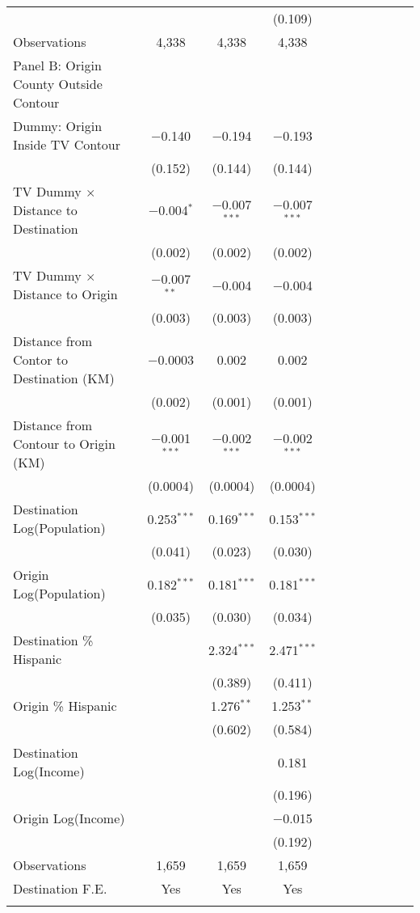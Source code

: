 \begin{table}[!h]
{\begin{threeparttable}
\begin{tabular}{lcccccccccc}
  &  &  & (0.109) \\ 
Observations & 4,338 & 4,338 & 4,338 \\ 
\hline\addlinespace
Panel B: Origin County Outside Contour & & & \\ 
\hline\addlinespace
 Dummy: Origin Inside TV Contour & $-$0.140 & $-$0.194 & $-$0.193 \\ 
  & (0.152) & (0.144) & (0.144) \\ 
 TV Dummy $\times$ Distance to Destination & $-$0.004$^{*}$ & $-$0.007$^{***}$ & $-$0.007$^{***}$ \\ 
  & (0.002) & (0.002) & (0.002) \\ 
 TV Dummy $\times$ Distance to Origin & $-$0.007$^{**}$ & $-$0.004 & $-$0.004 \\ 
  & (0.003) & (0.003) & (0.003) \\ 
 Distance from Contor to Destination (KM) & $-$0.0003 & 0.002 & 0.002 \\ 
  & (0.002) & (0.001) & (0.001) \\ 
 Distance from Contour to Origin (KM) & $-$0.001$^{***}$ & $-$0.002$^{***}$ & $-$0.002$^{***}$ \\ 
  & (0.0004) & (0.0004) & (0.0004) \\ 
 Destination Log(Population) & 0.253$^{***}$ & 0.169$^{***}$ & 0.153$^{***}$ \\ 
  & (0.041) & (0.023) & (0.030) \\ 
 Origin Log(Population) & 0.182$^{***}$ & 0.181$^{***}$ & 0.181$^{***}$ \\ 
  & (0.035) & (0.030) & (0.034) \\ 
 Destination \% Hispanic &  & 2.324$^{***}$ & 2.471$^{***}$ \\ 
  &  & (0.389) & (0.411) \\ 
 Origin \% Hispanic &  & 1.276$^{**}$ & 1.253$^{**}$ \\ 
  &  & (0.602) & (0.584) \\ 
 Destination Log(Income) &  &  & 0.181 \\ 
  &  &  & (0.196) \\ 
 Origin Log(Income) &  &  & $-$0.015 \\ 
  &  &  & (0.192) \\ 
Observations & 1,659 & 1,659 & 1,659 \\        
\hline\addlinespace
                                Destination F.E. & Yes & Yes  & Yes\\
				\addlinespace\hline\hline
			\end{tabular}

\end{threeparttable}}
\end{table}
